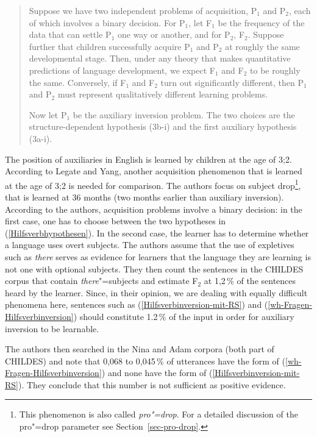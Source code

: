 \begin{quote}
   Suppose we have two independent problems of acquisition, P$_1$ and P$_2$, each
of which involves a binary decision. For P$_1$, let F$_1$ be the frequency of the
data that can settle P$_1$ one way or another, and for P$_2$, F$_2$. Suppose further
that children successfully acquire P$_1$ and P$_2$ at roughly the same developmental
stage. Then, under any theory that makes quantitative predictions of language
development, we expect F$_1$ and F$_2$ to be roughly the same. Conversely, if F$_1$ and
F$_2$ turn out significantly different, then P$_1$ and P$_2$ must represent qualitatively
different learning problems.

   Now let P$_1$ be the auxiliary inversion problem. The two choices are the
structure-dependent hypothesis (3b-i) and the first auxiliary hypothesis (3a-i). \citep[]{LY2002a}
\end{quote}

\noindent
The position of auxiliaries in English is learned by children at the age of 3;2. According to Legate
and Yang, another acquisition phenomenon that is learned at the age of 3;2 is needed for
comparison. The authors focus on subject drop\footnote{%
  This phenomenon is also called \emph{pro"=drop}. For a detailed discussion of the pro"=drop
  parameter see Section~\ref{sec-pro-drop}.
}, that is learned
at 36 months (two months earlier than auxiliary inversion). According to the authors, acquisition problems involve a binary decision:
in the first case, one has to choose between the two hypotheses in (\ref{Hilfsverbhypothesen}). In the second case, the learner has to determine
whether a language uses overt subjects. The authors assume that the use of expletives such as \emph{there} serves as
evidence for learners that the language they are learning is not one with optional subjects. They then count the sentences in the CHILDES corpus
that contain \emph{there}"=subjects and estimate F$_2$ at 1,2\,\% of the sentences heard by the learner.
Since, in their opinion, we are dealing with equally difficult phenomena here, sentences such as (\ref{Hilfsverbinversion-mit-RS}) and (\ref{wh-Fragen-Hilfsverbinversion})
should constitute 1.2\,\% of the input in order for auxiliary inversion to be learnable.

The authors then searched in the Nina and Adam corpora (both part of CHILDES) and note that 0,068 to 0,045\,\% of utterances have the form of
(\ref{wh-Fragen-Hilfsverbinversion}) and none have the form of (\ref{Hilfsverbinversion-mit-RS}). They conclude that this number is not sufficient as positive evidence.

